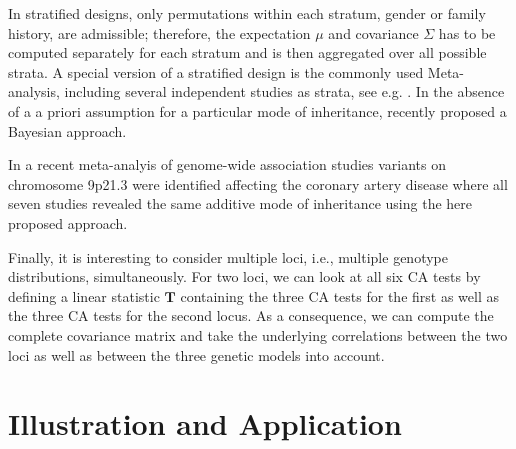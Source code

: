 \documentclass[bimj,fleqn]{w-art}
\newcommand{\T}{\mathbf{T}}
\begin{document}
In stratified designs, only permutations within each stratum, gender or
family history, are 
admissible; therefore, the expectation $\mu$ and covariance $\Sigma$ has
to be computed separately for each stratum and is then aggregated
over all possible strata. A special version of a stratified design is the commonly used Meta-analysis, 
including several independent studies as strata, see e.g. \citet{Kavvoura2008}. 
In the absence of a a priori assumption for a particular mode of inheritance, recently 
 \citet{Salanti2008} proposed a Bayesian approach.
 
 In a recent meta-analyis of genome-wide association studies variants on chromosome 9p21.3 
 were identified affecting the coronary artery disease \citep{Schunkert2008} 
 where all seven studies revealed the same additive mode of inheritance using the here proposed approach.


Finally, it is interesting to consider multiple loci, i.e., 
multiple genotype distributions, simultaneously. For two loci, 
we can look at all six CA tests by defining a linear statistic
$\T$ containing the three CA tests for the first as well 
as the three CA tests for the second locus. As a consequence,
we can compute the complete covariance matrix and take the 
underlying correlations between the two loci as well as between the three genetic models into account.

\section{Illustration and Application}
\end{document}
